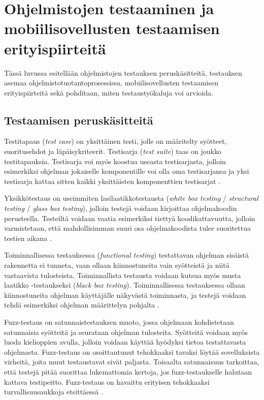 \section{Ohjelmistojen testaaminen ja mobiilisovellusten testaamisen erityispiirteitä}

Tässä luvussa esitellään ohjelmistojen testauksen peruskäsitteitä, testauksen asemaa ohjelmistotuotantoprosessissa, mobiilisovellusten testaamisen erityispiirteitä sekä pohditaan, miten testaustyökaluja voi arvioida.

\subsection{Testaamisen peruskäsitteitä}

Testitapaus (\emph{test case}) on yksittäinen testi, jolle on määritelty syötteet, suoritusehdot ja läpäisykriteerit. Testisarja (\emph{test suite}) taas on joukko testitapauksia. Testisarja voi myös koostua useasta testisarjasta, jolloin esimerkiksi ohjelman jokaiselle komponentille voi olla oma testisarjansa ja yksi testisarja kattaa sitten kaikki yksittäisten komponenttien testisarjat \cite[153]{testing}.

Yksikkötestaus on useimmiten lasilaatikkotestausta (\emph{white box testing} / \emph{structural testing} / \emph{glass box testing}), jolloin testejä voidaan kirjoittaa ohjelmakoodin perusteella. Testeiltä voidaan vaatia esimerkiksi tiettyä koodikattavuutta, jolloin varmistetaan, että mahdollisimman suuri osa ohjelmakoodista tulee suoritettua testien aikana \cite[154]{testing}.

Toiminnallisessa testauksessa (\emph{functional testing}) testattavan ohjelman sisäistä rakennetta ei tunneta, vaan ollaan kiinnostuneita vain syötteistä ja niitä vastaavista tulosteista. Toiminnallista testausta voidaan kutsua myös musta laatikko -testaukseksi (\emph{black box testing}). Toiminnallisessa testauksessa ollaan kiinnostuneita ohjelman käyttäjälle näkyvästä toiminnasta, ja testejä voidaan tehdä esimerkiksi ohjelman määrittelyn pohjalta \cite[161-162]{testing}.

Fuzz-testaus on satunnaistestauksen muoto, jossa ohjelmaan kohdistetaan satunnaisia syötteitä ja seurataan ohjelman tulosteita. Syötteitä voidaan myös luoda kielioppien avulla, jolloin voidaan käyttää hyödyksi tietoa testattavasta ohjelmasta. Fuzz-testaus on osoittautunut tehokkaaksi tavaksi löytää sovelluksista virheitä, joita muut testaustavat eivät paljasta. Toisaalta satunnaisuus tarkoittaa, että testejä pitää suorittaa lukemattomia kertoja, jos fuzz-testaukselle halutaan kattava testipeitto. Fuzz-testaus on havaittu erityisen tehokkaaksi turvallisuusaukkoja etsittäessä \cite{fuzztesting}.

